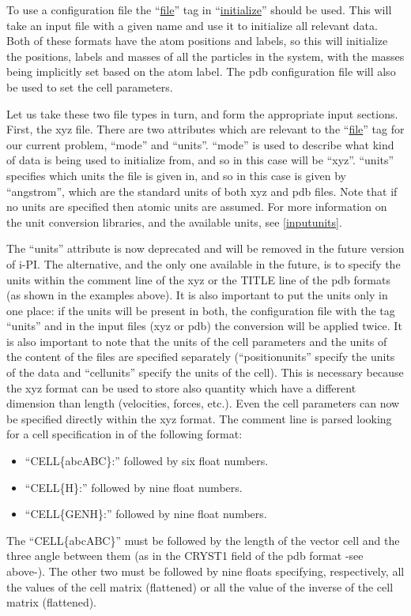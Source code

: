 \documentclass[11pt,english,fleqn]{report}
\begin{document}
To use a configuration file the {}``\hyperref[INITFILE]{file}'' tag in
{}``\hyperref[INITIALIZER]{initialize}'' should be used.
This will take an input file with a given name and use it to initialize
all relevant data. Both of these formats have the atom
positions and labels, so this will initialize the positions, labels
and masses of all the particles in the system, with the masses being
implicitly set based on the atom label. The pdb configuration file
will also be used to set the cell parameters.

Let us take these two file types in turn, and form the appropriate
input sections. First, the xyz file.
There are two attributes which are
relevant to the {}``\hyperref[INITFILE]{file}'' tag
for our current problem, {}``mode'' and {}``units''.
{}``mode'' is used to describe what kind of data is being used to
initialize from, and so in this case will be {}``xyz''.
{}``units'' specifies which units the file is given in, and
so in this case is given by {}``angstrom'', which are the
standard units of both xyz and pdb files.
Note that if no units are specified then atomic units are assumed.
For more information on the \ipi unit conversion libraries,
and the available units, see \ref{inputunits}.

The {}``units'' attribute is now deprecated and will be removed in the
future version of i-PI. The alternative, and the only one available in
the future, is to specify the units within the comment line of the xyz
or the TITLE line of the pdb formats (as shown in the examples
above). It is also important to put the units only in one place: if
the units will be present in both, the configuration file with the tag
{}``units'' and in the input files (xyz or pdb) the conversion will be
applied twice. It is also important to note that the units of the cell
parameters and the units of the content of the files are specified
separately ({}``position{units}'' specify the units of the data and
{}``cell{units}'' specify the units of the cell). This is necessary
because the xyz format can be used to
store also quantity which have a different dimension than length
(velocities, forces, etc.). Even the cell parameters can now be specified
directly within the xyz format. The comment line is parsed looking for
a cell specification in of the following format:
\begin{itemize}
\item ``CELL\{abcABC\}:'' followed by six float numbers.
\item ``CELL\{H\}:'' followed by nine float numbers.
\item ``CELL\{GENH\}:'' followed by nine float numbers.
\end{itemize}
The {}``CELL\{abcABC\}'' must be followed by the length of the vector
cell and the three angle between them (as in the CRYST1 field of the
pdb format -see above-). The other two must be followed
by nine floats specifying, respectively, all the values of the cell
matrix (flattened) or all the value of the inverse of the cell matrix
(flattened).
\end{document}
